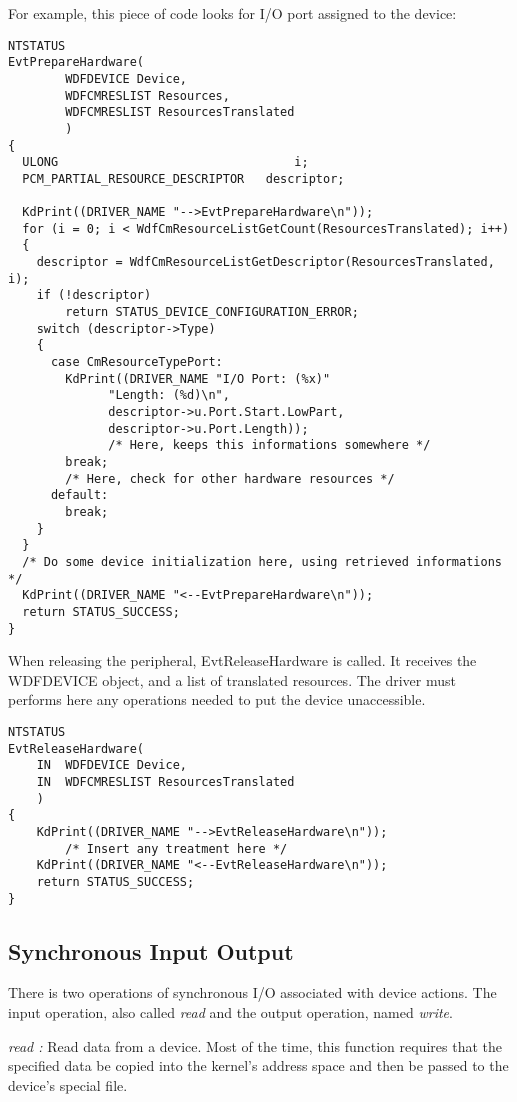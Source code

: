 \documentclass[11pt]{report}
\begin{document}
For example, this piece of code looks for I/O port assigned to the device:
\begin{lstlisting}
NTSTATUS
EvtPrepareHardware(
		WDFDEVICE Device,
		WDFCMRESLIST Resources,
		WDFCMRESLIST ResourcesTranslated
		)
{
  ULONG                                 i;
  PCM_PARTIAL_RESOURCE_DESCRIPTOR	descriptor;
  
  KdPrint((DRIVER_NAME "-->EvtPrepareHardware\n"));
  for (i = 0; i < WdfCmResourceListGetCount(ResourcesTranslated); i++)
  {
    descriptor = WdfCmResourceListGetDescriptor(ResourcesTranslated, i);
    if (!descriptor)
        return STATUS_DEVICE_CONFIGURATION_ERROR;
    switch (descriptor->Type)
    {
      case CmResourceTypePort:
        KdPrint((DRIVER_NAME "I/O Port: (%x)"
              "Length: (%d)\n",
              descriptor->u.Port.Start.LowPart,
              descriptor->u.Port.Length));
              /* Here, keeps this informations somewhere */
        break;
        /* Here, check for other hardware resources */
      default:
        break;
    }
  }
  /* Do some device initialization here, using retrieved informations */
  KdPrint((DRIVER_NAME "<--EvtPrepareHardware\n"));
  return STATUS_SUCCESS;
}
\end{lstlisting}

When releasing the peripheral, EvtReleaseHardware is called.
It receives the WDFDEVICE object, and a list of translated resources.
The driver must performs here any operations needed to put the device
unaccessible.
\begin{lstlisting}
NTSTATUS
EvtReleaseHardware(
    IN  WDFDEVICE Device,
    IN  WDFCMRESLIST ResourcesTranslated
    )
{
	KdPrint((DRIVER_NAME "-->EvtReleaseHardware\n"));
        /* Insert any treatment here */
	KdPrint((DRIVER_NAME "<--EvtReleaseHardware\n"));
	return STATUS_SUCCESS;
}
\end{lstlisting}

\subsection{Synchronous Input Output}

There is two operations of synchronous I/O associated with device actions.
The input operation, also called {\it read} and the output operation, named
{\it write}.

{\it read :} Read data from a device. Most of the time, this function requires
that the specified data be copied into the kernel's address space and then be
passed to the device's special file.
\end{document}
